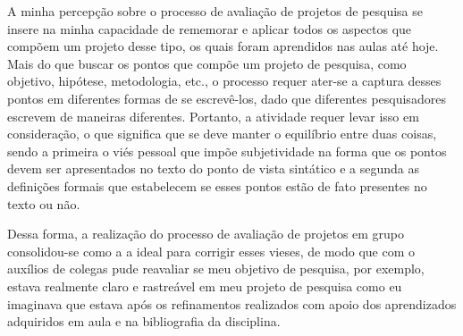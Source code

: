 \documentclass{article}
\begin{document}
A minha percepção sobre o processo de avaliação de projetos de pesquisa se insere na minha capacidade de rememorar e aplicar todos os aspectos que compõem um projeto desse tipo, os quais foram aprendidos nas aulas até hoje.
 Mais do que buscar os pontos que  compõe um projeto de pesquisa, como objetivo, hipótese, metodologia, etc., o processo requer ater-se a captura desses pontos em diferentes formas de se escrevê-los, dado que diferentes pesquisadores escrevem de maneiras diferentes. Portanto, a atividade requer levar isso em consideração, o que significa que se deve manter o equilíbrio entre duas coisas, sendo a primeira o viés pessoal que impõe subjetividade na forma que os pontos devem ser apresentados no texto do ponto de vista sintático e a segunda as definições formais que estabelecem se esses pontos estão de fato presentes no texto ou não.
 
 Dessa forma, a realização do processo de avaliação de projetos em grupo consolidou-se como a a ideal para corrigir esses vieses, de modo que com o auxílios de colegas pude reavaliar se meu objetivo de pesquisa, por exemplo, estava realmente claro e rastreável em meu projeto de pesquisa como eu imaginava que estava após os refinamentos realizados com apoio dos aprendizados adquiridos em aula e na bibliografia da disciplina. 
 
\end{document}
